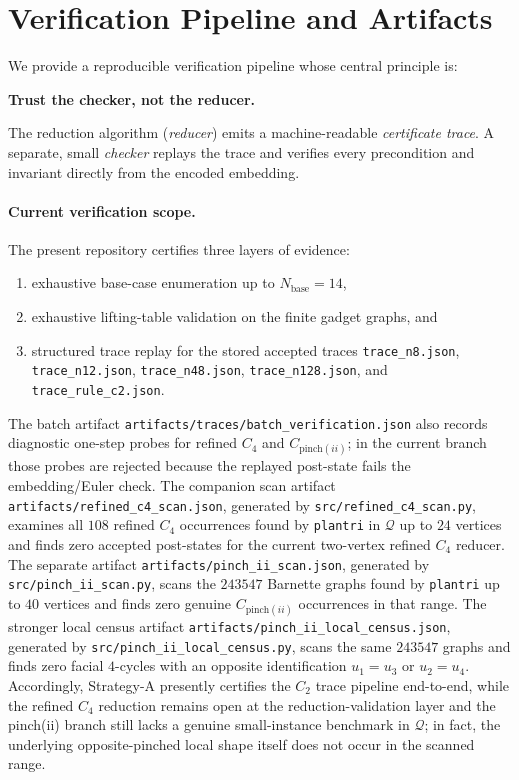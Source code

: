 \documentclass[12pt]{article}
\theoremstyle{definition}
\begin{document}
\section{Verification Pipeline and Artifacts}
\label{sec:verification}
\label{app:reproducibility}

We provide a reproducible verification pipeline whose central principle is:

\medskip\noindent
\textbf{Trust the checker, not the reducer.}
\medskip

The reduction algorithm (\emph{reducer}) emits a machine-readable \emph{certificate trace}.
A separate, small \emph{checker} replays the trace and verifies every precondition and invariant
directly from the encoded embedding.

\paragraph{Current verification scope.}
The present repository certifies three layers of evidence:
\begin{enumerate}
  \item exhaustive base-case enumeration up to $N_{\mathrm{base}}=14$,
  \item exhaustive lifting-table validation on the finite gadget graphs, and
  \item structured trace replay for the stored accepted traces \texttt{trace\_n8.json}, \texttt{trace\_n12.json}, \texttt{trace\_n48.json}, \texttt{trace\_n128.json}, and \texttt{trace\_rule\_c2.json}.
\end{enumerate}
The batch artifact \texttt{artifacts/traces/batch\_verification.json} also records diagnostic one-step probes for refined $C_4$ and $C_{\mathrm{pinch}(ii)}$; in the current branch those probes are rejected because the replayed post-state fails the embedding/Euler check. The companion scan artifact \texttt{artifacts/refined\_c4\_scan.json}, generated by \texttt{src/refined\_c4\_scan.py}, examines all $108$ refined $C_4$ occurrences found by \texttt{plantri} in $\mathcal Q$ up to $24$ vertices and finds zero accepted post-states for the current two-vertex refined $C_4$ reducer. The separate artifact \texttt{artifacts/pinch\_ii\_scan.json}, generated by \texttt{src/pinch\_ii\_scan.py}, scans the $243547$ Barnette graphs found by \texttt{plantri} up to $40$ vertices and finds zero genuine $C_{\mathrm{pinch}(ii)}$ occurrences in that range. The stronger local census artifact \texttt{artifacts/pinch\_ii\_local\_census.json}, generated by \texttt{src/pinch\_ii\_local\_census.py}, scans the same $243547$ graphs and finds zero facial $4$-cycles with an opposite identification $u_1=u_3$ or $u_2=u_4$. Accordingly, Strategy-A presently certifies the $C_2$ trace pipeline end-to-end, while the refined $C_4$ reduction remains open at the reduction-validation layer and the pinch(ii) branch still lacks a genuine small-instance benchmark in $\mathcal Q$; in fact, the underlying opposite-pinched local shape itself does not occur in the scanned range.
\end{document}
